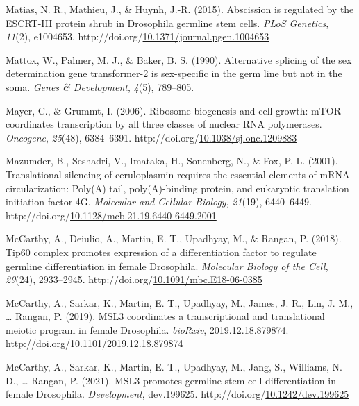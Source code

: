 \documentclass[12pt,oneside]{reedthesis}
\newlength{\cslhangindent}
\newenvironment{CSLReferences}[2] %
 {%
  \setlength{\parindent}{0pt}
  \ifodd #1 \everypar{\setlength{\hangindent}{\cslhangindent}}\ignorespaces\fi
  \ifnum #2 > 0
  \setlength{\parskip}{#2\baselineskip}
  \fi
 }%
 {}
\begin{document}
\begin{CSLReferences}{1}{0}
\leavevmode{}%
Matias, N. R., Mathieu, J., \& Huynh, J.-R. (2015). Abscission is regulated by the {ESCRT-III} protein shrub in {Drosophila} germline stem cells. \emph{PLoS Genetics}, \emph{11}(2), e1004653. http://doi.org/\href{https://doi.org/10.1371/journal.pgen.1004653}{10.1371/journal.pgen.1004653}

\leavevmode{}%
Mattox, W., Palmer, M. J., \& Baker, B. S. (1990). Alternative splicing of the sex determination gene transformer-2 is sex-specific in the germ line but not in the soma. \emph{Genes \& Development}, \emph{4}(5), 789--805.

\leavevmode{}%
Mayer, C., \& Grummt, I. (2006). Ribosome biogenesis and cell growth: {mTOR} coordinates transcription by all three classes of nuclear {RNA} polymerases. \emph{Oncogene}, \emph{25}(48), 6384--6391. http://doi.org/\href{https://doi.org/10.1038/sj.onc.1209883}{10.1038/sj.onc.1209883}

\leavevmode{}%
Mazumder, B., Seshadri, V., Imataka, H., Sonenberg, N., \& Fox, P. L. (2001). Translational silencing of ceruloplasmin requires the essential elements of {mRNA} circularization: Poly({A}) tail, poly({A})-binding protein, and eukaryotic translation initiation factor {4G}. \emph{Molecular and Cellular Biology}, \emph{21}(19), 6440--6449. http://doi.org/\href{https://doi.org/10.1128/mcb.21.19.6440-6449.2001}{10.1128/mcb.21.19.6440-6449.2001}

\leavevmode{}%
McCarthy, A., Deiulio, A., Martin, E. T., Upadhyay, M., \& Rangan, P. (2018). Tip60 complex promotes expression of a differentiation factor to regulate germline differentiation in female {Drosophila}. \emph{Molecular Biology of the Cell}, \emph{29}(24), 2933--2945. http://doi.org/\href{https://doi.org/10.1091/mbc.E18-06-0385}{10.1091/mbc.E18-06-0385}

\leavevmode{}%
McCarthy, A., Sarkar, K., Martin, E. T., Upadhyay, M., James, J. R., Lin, J. M., \ldots{} Rangan, P. (2019). {MSL3} coordinates a transcriptional and translational meiotic program in female {Drosophila}. \emph{bioRxiv}, 2019.12.18.879874. http://doi.org/\href{https://doi.org/10.1101/2019.12.18.879874}{10.1101/2019.12.18.879874}

\leavevmode{}%
McCarthy, A., Sarkar, K., Martin, E. T., Upadhyay, M., Jang, S., Williams, N. D., \ldots{} Rangan, P. (2021). {MSL3} promotes germline stem cell differentiation in female {Drosophila}. \emph{Development}, dev.199625. http://doi.org/\href{https://doi.org/10.1242/dev.199625}{10.1242/dev.199625}


\end{CSLReferences}
\end{document}
